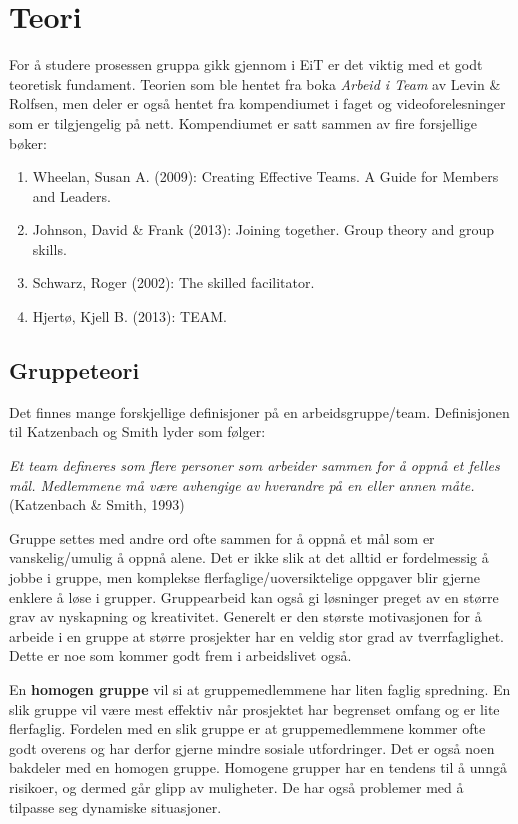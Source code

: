\chapter{Teori}
For å studere prosessen gruppa gikk gjennom i EiT er det viktig med et godt teoretisk fundament. 
Teorien som ble hentet fra boka \textit{Arbeid i Team} av Levin \& Rolfsen, men deler er også hentet fra kompendiumet i faget og videoforelesninger som er tilgjengelig på nett. 
Kompendiumet er satt sammen av fire forsjellige bøker:
\begin{enumerate}
    \item Wheelan, Susan A. (2009): Creating Effective Teams. A Guide for Members and Leaders.
    \item Johnson, David \& Frank (2013): Joining together. Group theory and group skills.
    \item Schwarz, Roger (2002): The skilled facilitator. 
    \item Hjertø, Kjell B. (2013): TEAM.
\end{enumerate}

\section{Gruppeteori}
Det finnes mange forskjellige definisjoner på en arbeidsgruppe/team. 
Definisjonen til Katzenbach og Smith lyder som følger:

\begin{center}
\textit{Et team defineres som flere personer som arbeider sammen for å oppnå et felles mål. 
Medlemmene må være avhengige av hverandre på en eller annen måte.}
\newline 
(Katzenbach \& Smith, 1993)
\end{center}

Gruppe settes med andre ord ofte sammen for å oppnå et mål som er vanskelig/umulig å oppnå alene. 
Det er ikke slik at det alltid er fordelmessig å jobbe i gruppe, men komplekse flerfaglige/uoversiktelige oppgaver blir gjerne enklere å løse i grupper.
Gruppearbeid kan også gi løsninger preget av en større grav av nyskapning og kreativitet. 
Generelt er den største motivasjonen for å arbeide i en gruppe at større prosjekter har en veldig stor grad av tverrfaglighet. 
Dette er noe som kommer godt frem i arbeidslivet også. 
\vspace{\secspace}

En \textbf{homogen gruppe} vil si at gruppemedlemmene har liten faglig spredning. 
En slik gruppe vil være mest effektiv når prosjektet har begrenset omfang og er lite flerfaglig. 
Fordelen med en slik gruppe er at gruppemedlemmene kommer ofte godt overens og har derfor gjerne mindre sosiale utfordringer. 
Det er også noen bakdeler med en homogen gruppe. 
Homogene grupper har en tendens til å unngå risikoer, og dermed går glipp av muligheter. 
De har også problemer med å tilpasse seg dynamiske situasjoner.
\vspace{\secspace}

